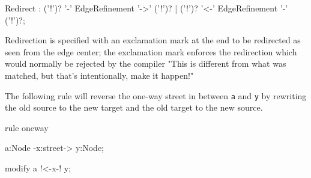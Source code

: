 \begin{rail}
Redirect : ('!')? '-' EdgeRefinement '->' ('!')? | ('!')? '<-' EdgeRefinement '-' ('!')?;
\end{rail}

Redirection is specified with an exclamation mark at the end to be redirected as seen from the edge center;
the exclamation mark enforces the redirection which would normally be rejected by the compiler "This is different from what was matched, but that's intentionally, make it happen!"

\begin{example}
The following rule will reverse the one-way street in between \texttt{a} and \texttt{y} by rewriting the old source to the new target and the old target to the new source.
\begin{grgen}
rule oneway {
  a:Node -x:street-> y:Node;

  modify {
    a !<-x-! y;
  }
}
\end{grgen}
\end{example}


